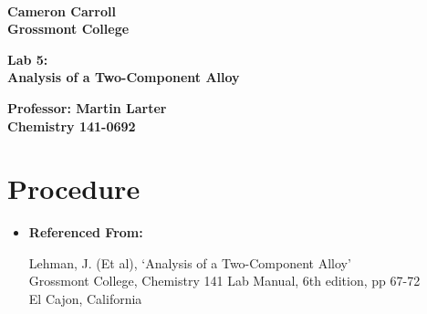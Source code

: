 \documentclass[fleqn,titlepage]{article}
\begin{document}
\begin{titlepage}
  \mbox{}\\[1.25cm]
  \textbf{\LARGE Cameron Carroll \\ Grossmont College}\\[2.25cm]
  \begin{center}
    \textbf{\huge Lab 5: \\ Analysis of a Two-Component Alloy}\\[2.50cm]
  \end{center}
  \textbf{\LARGE Professor: Martin Larter \\ Chemistry 141-0692} \\
  \vfill
\end{titlepage}

\section*{Procedure}
\begin{itemize}
  \item  \textbf{Referenced From:} \\
    \begin{addmargin}[1em]{1em}
      Lehman, J. (Et al), `Analysis of a Two-Component Alloy' \\
      Grossmont College, Chemistry 141 Lab Manual, 6th edition, pp 67-72 \\
      El Cajon, California
    \end{addmargin}
\end{itemize}
\end{document}
